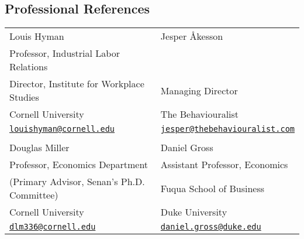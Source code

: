\documentclass[letterpaper,11pt,oneside]{article}
\begin{document}
\newpage
\subsection*{Professional References}
    \begin{tabularx}{\textwidth}{@{} X X}
        Louis Hyman                                             & Jesper Åkesson \\
        Professor, Industrial Labor Relations                    \\
        Director, Institute for Workplace Studies               & Managing Director  \\
        Cornell University                                      & The Behaviouralist \\
        \href{mailto:louishyman@cornell.edu}{\nolinkurl{louishyman@cornell.edu}} &
            \href{mailto:jesper@thebehaviouralist.com}{\nolinkurl{jesper@thebehaviouralist.com}} \\
            \\
        Douglas Miller                                          & Daniel Gross \\
        Professor, Economics Department                         & Assistant Professor, Economics \\
        (Primary Advisor, Senan's Ph.D. Committee)              & Fuqua School of Business \\
        Cornell University                                      & Duke University \\
        \href{mailto:dlm336@cornell.edu}{\nolinkurl{dlm336@cornell.edu}} &
        \href{mailto:daniel.gross@duke.edu}{\nolinkurl{daniel.gross@duke.edu}}
    \end{tabularx}
\end{document}

